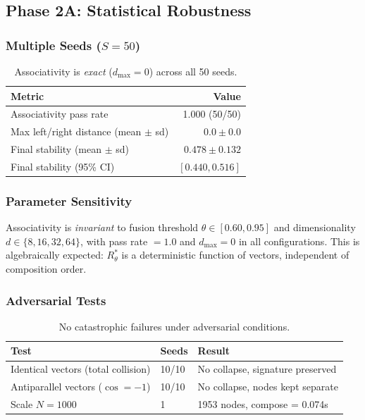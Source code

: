 \documentclass[11pt,a4paper]{article}
\theoremstyle{definition}
\begin{document}
\subsection{Phase 2A: Statistical Robustness}

\subsubsection{Multiple Seeds ($S = 50$)}

\begin{table}[h]
\centering
\begin{tabular}{lr}
\toprule
\textbf{Metric} & \textbf{Value} \\
\midrule
Associativity pass rate & 1.000 (50/50) \\
Max left/right distance (mean $\pm$ sd) & $0.0 \pm 0.0$ \\
Final stability (mean $\pm$ sd) & $0.478 \pm 0.132$ \\
Final stability (95\% CI) & $[0.440, 0.516]$ \\
\bottomrule
\end{tabular}
\caption{Associativity is \emph{exact} ($d_{\max} = 0$) across all 50 seeds.}
\end{table}

\subsubsection{Parameter Sensitivity}

Associativity is \emph{invariant} to fusion threshold $\theta \in [0.60, 0.95]$ and dimensionality $d \in \{8, 16, 32, 64\}$, with pass rate $= 1.0$ and $d_{\max} = 0$ in all configurations. This is algebraically expected: $R_\theta^*$ is a deterministic function of vectors, independent of composition order.

\subsubsection{Adversarial Tests}

\begin{table}[h]
\centering
\begin{tabular}{lll}
\toprule
\textbf{Test} & \textbf{Seeds} & \textbf{Result} \\
\midrule
Identical vectors (total collision) & 10/10 & No collapse, signature preserved \\
Antiparallel vectors ($\cos = -1$) & 10/10 & No collapse, nodes kept separate \\
Scale $N = 1000$ & 1 & 1953 nodes, compose = 0.074s \\
\bottomrule
\end{tabular}
\caption{No catastrophic failures under adversarial conditions.}
\end{table}
\end{document}
